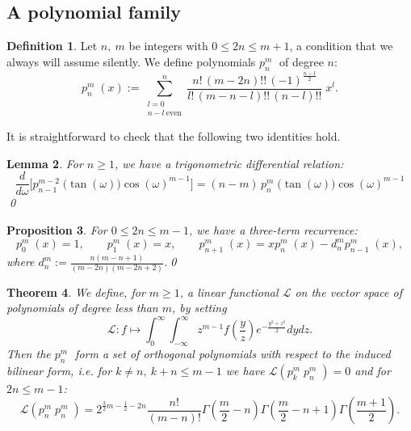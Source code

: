 \documentclass{amsart}
\newcommand{\ie}{{\it i.e. }}
\newcommand{\p}[2]{p_{#1}^{#2}\;\!\!}
\renewcommand{\L}{\mathcal{L}}
\newcommand{\coloneqq}{:=}
\theoremstyle{plain}
\newtheorem{theorem}{Theorem}[section]
\newtheorem{lemma}[theorem]{Lemma}
\newtheorem{proposition}[theorem]{Proposition}
\theoremstyle{definition}
\newtheorem{definition}[theorem]{Definition}
\theoremstyle{remark}
\begin{document}
\subsection{A polynomial family}
\begin{definition} Let $n,\ m$ be integers with $0\leq 2n\leq m+1$, a condition that we always will assume silently. We define polynomials $\p{n}{m}$ of degree $n$:
\begin{equation}
\p{n}{m}(x) \coloneqq \sum_{\substack{l=0\\ n-l\ \text{even}}}^n \frac{n!\,(m-2n)!!\,(-1)^{\frac{n-l}{2}}}{l!\,(m-n-l)!!\,(n-l)!!}\;x^l.
\end{equation}
\end{definition}
It is straightforward to check that the following two identities hold.
\begin{lemma} \label{trigonometric}
For $n\geq 1$, we have a trigonometric differential relation:
\begin{equation}
\frac{d}{d\omega} \Big[\p{n-1}{m-2}\big(\tan(\omega)\big)\cos(\omega)^{m-1} \Big]= (n-m)\, \p{n}{m}\big(\tan(\omega)\big)\cos(\omega)^{m-1}
\end{equation} \qed
\end{lemma}
\begin{proposition} \label{threeterm} For $0\leq 2n\leq m-1$, we have a three-term recurrence:
\begin{equation}
\p{0}{m}(x) = 1,\qquad \p{1}{m}(x) = x, \qquad \p{n+1}{m}(x) = x\p{n}{m}(x) -d_n^m \p{n-1}{m}(x),
\end{equation} 
where $d_n^m\coloneqq \frac{n(m-n+1)}{(m-2n)(m-2n+2)}$.\qed
\end{proposition}
\begin{theorem} \label{pthm}We define, for $m\geq 1$, a linear functional $\L$ on the vector space of polynomials of degree less than $m$, by setting
\begin{equation}
\L: f \longmapsto \int_0^\infty\!\!\! \int_{-\infty}^\infty z^{m-1}f\left(\frac{y}{z}\right) e^{-\frac{y^2+z^2}{2}} dydz.
\end{equation}
Then the $\p{n}{m}$ form a set of orthogonal polynomials with respect to the induced bilinear form, \ie for $k\neq n,\ k\!+\! n\leq m\!-\!1$ we have $\L(\p{k}{m}\p{n}{m})=0$ and for $2n\leq m\!-\!1$:
\begin{equation} \label{Lpn2}
\L(\p{n}{m}\p{n}{m}) = 2^{\frac{3}{2}m-\frac{1}{2}-2n}  \frac{n!}{(m-n)!}
\Gamma\left(\frac{m}{2}-n\right)\Gamma\left(\frac{m}{2}-n+1\right)\Gamma\left(\frac{m+1}{2}\right).
\end{equation}
\end{theorem}
\end{document}
